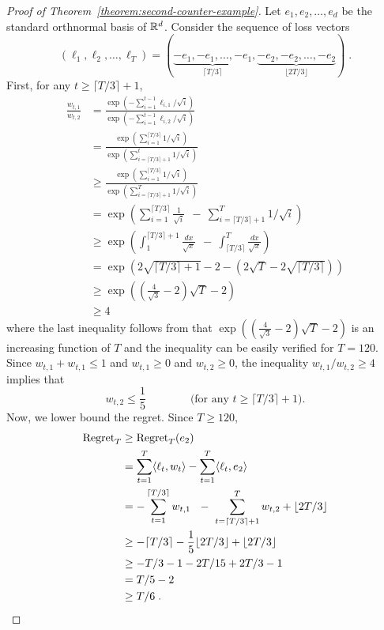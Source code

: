 \begin{proof}[Proof of Theorem~\ref{theorem:second-counter-example}]
Let $e_1, e_2, \dots, e_d$ be the standard orthnormal basis of $\mathbb{R}^d$. Consider
the sequence of loss vectors
$$
(\ell_1, \ell_2, \dots, \ell_T) = ( \underbrace{-e_1, -e_1, \dots, -e_1}_{\lceil T/3 \rceil}, \underbrace{-e_2, -e_2, \dots, -e_2}_{\lfloor 2T/3 \rfloor}) \; .
$$
First, for any $t \ge \lceil T/3 \rceil + 1$,
\begin{align*}
\frac{w_{t,1}}{w_{t,2}}
& = \frac{\exp(-\sum_{i=1}^{t-1} \ell_{i,1}/\sqrt{i})}{\exp(-\sum_{i=1}^{t-1} \ell_{i,2}/\sqrt{i})} \\
& = \frac{\exp(\sum_{i=1}^{\lceil T/3 \rceil} 1/\sqrt{i})}{\exp(\sum_{i=\lceil T/3 \rceil + 1}^t 1/\sqrt{i})} \\
& \ge \frac{\exp(\sum_{i=1}^{\lceil T/3 \rceil} 1/\sqrt{i})}{\exp(\sum_{i=\lceil T/3 \rceil + 1}^T 1/\sqrt{i})} \\
& = \exp\left(\sum_{i=1}^{\lceil T/3 \rceil} \frac{1}{\sqrt{i}} \ \ - \ \sum_{i=\lceil T/3 \rceil + 1}^T 1/\sqrt{i} \right) \\
& \ge \exp\left( \int_{1}^{\lceil T/3 \rceil + 1} \frac{dx}{\sqrt{x}} \ \ - \ \int_{\lceil T/3 \rceil}^T \frac{dx}{\sqrt{x}} \right) \\
& = \exp\left( 2\sqrt{\lceil T/3 \rceil + 1} - 2 - (2\sqrt{T} - 2 \sqrt{\lceil T/3 \rceil}) \right) \\
& \ge \exp\left( \left( \frac{4}{\sqrt{3}} - 2 \right) \sqrt{T} - 2 \right) \\
& \ge 4
\end{align*}
where the last inequality follows from that $\exp\left( \left(
\frac{4}{\sqrt{3}} - 2 \right) \sqrt{T} - 2 \right)$ is an increasing function
of $T$ and the inequality can be easily verified for $T=120$. Since $w_{t,1} +
w_{t,1} \le 1$ and $w_{t,1} \ge 0$ and $w_{t,2} \ge 0$, the inequality $w_{t,1}/w_{t,2} \ge 4$ implies that
$$
w_{t,2} \le \frac{1}{5} \qquad \qquad \text{(for any $t \ge \lceil T/3 \rceil + 1$)}.
$$
Now, we lower bound the regret. Since $T \ge 120$,
\begin{align*}
\operatorname{Regret}_T
& \ge \operatorname{Regret}_T(e_2) \\
& = \sum_{t=1}^T \langle \ell_t, w_t \rangle - \sum_{t=1}^T \langle \ell_t, e_2 \rangle \\
& = - \sum_{t=1}^{\lceil T/3 \rceil} w_{t,1} \ \ - \ \sum_{t=\lceil T/3 \rceil + 1}^T w_{t,2}  +  \lfloor 2T/3 \rfloor \\
& \ge - \lceil T/3 \rceil - \frac{1}{5} \lfloor 2T/3 \rfloor  +  \lfloor 2T/3 \rfloor \\
& \ge - T/3 - 1 - 2T/15 + 2T/3 - 1 \\
& = T/5 - 2 \\
& \ge T/6 \; .
\end{align*}
\end{proof}
